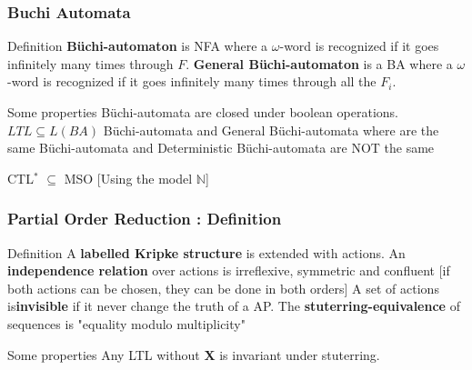 \documentclass[pdf]{beamer}
\newcommand{\N}{\ensuremath{\mathbb{N}}}
\begin{document}
\begin{frame}
\frametitle{Buchi Automata}

\begin{block}{Definition}
\textbf{Büchi-automaton} is NFA where a $\omega$-word is recognized if it goes infinitely many times through $F$.\newline
\textbf{General Büchi-automaton} is a BA where a $\omega$-word is recognized if it goes infinitely many times through all the $F_i$.\newline
\end{block}




\begin{alertblock}{Some properties}
Büchi-automata are closed under boolean operations. \newline
$LTL \subseteq L(BA)$ \newline
Büchi-automata and General Büchi-automata where are the same \newline	
Büchi-automata and Deterministic Büchi-automata are NOT the same \newline	

CTL$^*$ $\subseteq$ MSO [Using the model $\N$]\newline
\end{alertblock}

\end{frame}

\begin{frame}
\frametitle{Partial Order Reduction : Definition}

\begin{block}{Definition}
A \textbf{labelled Kripke structure} is extended with actions.\newline
An \textbf{independence relation} over actions is irreflexive, symmetric and confluent [if both actions can be chosen, they can be done in both orders]\newline
A set of actions is\textbf{invisible} if it never change the truth of a AP.\newline
The \textbf{stuterring-equivalence} of sequences is "equality modulo multiplicity"
\end{block}


\begin{alertblock}{Some properties}
Any LTL without \textbf{X} is invariant under stuterring.
\end{alertblock}
\end{frame}
\end{document}

